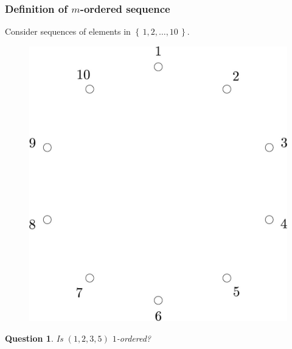 \documentclass{beamer}
\theoremstyle{plain}
\newtheorem{question}[theorem]{Question}
\theoremstyle{definition}
\theoremstyle{remark}
\renewcommand{\'}{\hspace{0.5mm}'}		%
\renewcommand{\Set}[1]{\left\{\,#1\,\right\}}	%
\begin{document}

\begin{frame}
\frametitle{Definition of $m$-ordered sequence}

	Consider sequences of elements in $\Set{1,2,\hdots, 10}$. 

	\begin{figure}
		\includegraphics[scale=0.1]{circ_10.jpg}
	\end{figure}
	
	\begin{question}
		Is $(1,2,3,5)$ $1$-ordered?
	\end{question}
	
\end{frame}

\end{document}
